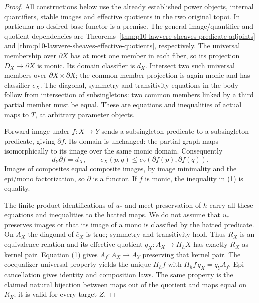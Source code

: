 \begin{proof}
All constructions below use the already established power objects,
internal quantifiers, stable images and effective quotients in the two
original topoi. In particular no desired base functor is a premise.
The general image/quantifier and quotient dependencies are
Theorems~\ref{thm:p10-lawvere-sheaves-predicate-adjoints} and
\ref{thm:p10-lawvere-sheaves-effective-quotients}, respectively.
The universal membership over \(\partial X\) has at most one
member in each fiber, so its projection \(D_X\to\partial X\)
is monic. Its domain classifier is \(d_X\). Intersect two such
universal members over \(\partial X\times\partial X\); the
common-member projection is again monic and has classifier \(e_X\).
The diagonal, symmetry and transitivity equations in the body follow
from intersection of subsingletons: two common members linked by a
third partial member must be equal. These are equations and inequalities
of actual maps to \(T\), at arbitrary parameter objects.

Forward image under \(f:X\to Y\) sends a subsingleton predicate
to a subsingleton predicate, giving \(\partial f\). Its domain
is unchanged: the partial graph maps isomorphically to its image over
the same monic domain. Consequently
\[
 d_Y\partial f=d_X,\qquad
 e_X(p,q)\le e_Y(\partial f(p),\partial f(q)).             \tag{1}
\]
Images of composites equal composite images, by image minimality and
the epi/mono factorization, so \(\partial\) is a functor.
If \(f\) is monic, the inequality in (1) is equality.

The finite-product identifications of \(u_*\) and meet preservation
of \(h\) carry all these equations and inequalities to the hatted
maps. We do not assume that \(u_*\) preserves images or that its
image of a mono is classified by the hatted predicate. On \(A_X\)
the diagonal of \(\widehat e_X\) is true; symmetry and transitivity
hold. Thus \(R_X\) is an equivalence relation and its effective
quotient \(q_X:A_X\to H_hX\) has exactly \(R_X\) as kernel
pair. Equation (1) gives \(A_f:A_X\to A_Y\) preserving that
kernel pair. The coequalizer universal property yields the unique
\(H_hf\) with \(H_hf\,q_X=q_YA_f\). Epi cancellation gives
identity and composition laws. The same property is the claimed
natural bijection between maps out of the quotient and maps equal
on \(R_X\); it is valid for every target \(Z\).


\end{proof}
